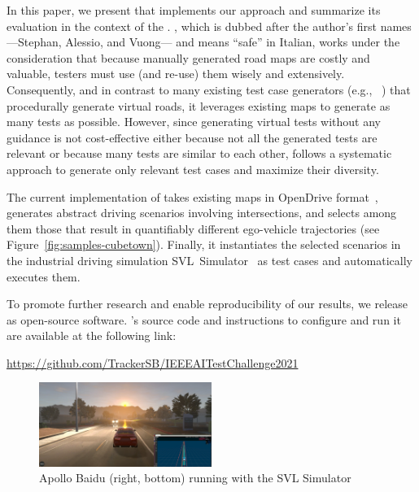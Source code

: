 \documentclass[conference]{IEEEtran}
\begin{document}
In this paper, we present \tool that implements our approach and summarize its evaluation in the context of the \challenge.
\tool, which is dubbed after the author's first names ---Stephan, Alessio, and Vuong--- and means ``safe'' in Italian, works under the consideration that because manually generated road maps are costly and valuable, testers must use (and re-use) them wisely and extensively. 
Consequently, and in contrast to many existing test case generators (e.g., ~\cite{DBLP:conf/icse/GambiMF19,DBLP:conf/icse/HuynhGF19,DBLP:conf/sigsoft/RiccioT20,DBLP:conf/issta/ZohdinasabRGT21,DBLP:conf/sbst/PanichellaGZR21}) that procedurally generate virtual roads, it leverages existing maps to generate as many tests as possible.
%
However, since generating virtual tests without any guidance is not cost-effective either because not all the generated tests are relevant or because many tests are similar to each other, \tool follows a systematic approach to generate only relevant test cases and maximize their diversity.

The current implementation of \tool takes existing maps in OpenDrive format~\cite{dupuis2010opendrive}, generates abstract driving scenarios involving intersections, and selects among them those that result in quantifiably different ego-vehicle trajectories (see Figure~\ref{fig:samples-cubetown}). Finally, it instantiates the selected scenarios in the industrial driving simulation SVL~Simulator~\cite{rong2020lgsvl} as test cases and automatically executes them.

To promote further research and enable reproducibility of our results, we release \tool as open-source software. \tool's source code and instructions to configure and run it are available at the following link:
\begin{center}
\href{https://github.com/TrackerSB/IEEEAITestChallenge2021}{https://github.com/TrackerSB/IEEEAITestChallenge2021}
\end{center}

\begin{figure}[tp]
  \centering
    \includegraphics[width=0.5\textwidth]{images/apollo-sim}
  \caption{Apollo Baidu (right, bottom) running with the SVL Simulator~\cite{svl-website}}
  \label{fig:apollosim}
\end{figure}
\end{document}
